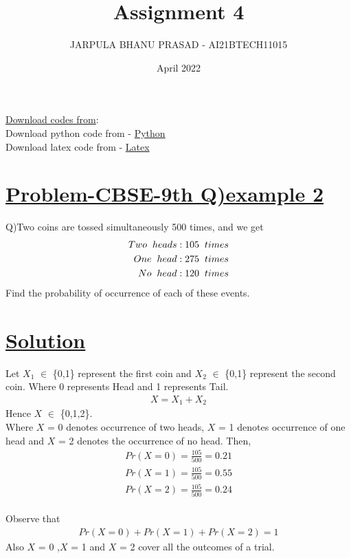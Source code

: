 \documentclass[journal,12pt,twocolumn]{IEEEtran}
\title{Assignment 4}
\author{JARPULA BHANU PRASAD - AI21BTECH11015}
\date{April 2022}
\begin{document}
\maketitle
\noindent \Large\underline{Download codes from}:\\
\noindent \large Download python code from - \href{https://github.com/jarpula-Bhanu/Assignment-4/blob/main/codes/probability.py}{Python}\\ Download latex code from - \href{https://github.com/jarpula-Bhanu/Assignment-4/blob/main/Assignment4.tex}{Latex}
\section{\large\underline{Problem-CBSE-9th Q)example 2}}
\large \noindent Q)Two coins are tossed simultaneously 500 times, and we get
\begin{align*}
Two \hspace{2mm} heads : 105 \hspace{2mm} times \\
One \hspace{2mm} head : 275 \hspace{2mm} times \\
No \hspace{2mm} head : 120 \hspace{2mm} times
\end{align*}
Find the probability of occurrence of each of these events.

\section{\large\underline{Solution}}
\noindent Let $X_1$ $\in$ \{0,1\} represent the first coin and $X_2$ $\in$ \{0,1\} represent the second coin. Where 0 represents Head and 1 represents Tail.
\begin{align}
X = X_1 + X_2
\end{align}
Hence $X$ $\in$ \{0,1,2\}.\\ Where $X$ = 0 denotes occurrence of two heads, $X$ = 1 denotes occurrence of one head and $X$ = 2 denotes the occurrence of no head. Then,
\begin{align}
Pr(X = 0) = \frac{105}{500} = 0.21 \\
Pr(X = 1) = \frac{105}{500} = 0.55 \\
Pr(X = 2) = \frac{105}{500} = 0.24 
\end{align}\\
Observe that 
\begin{align*}
Pr(X = 0) + Pr(X = 1) + Pr(X = 2) = 1
\end{align*}
 Also $X$ = 0 ,$X$ = 1 and $X$ = 2 cover all the outcomes of a trial.
\end{document}
